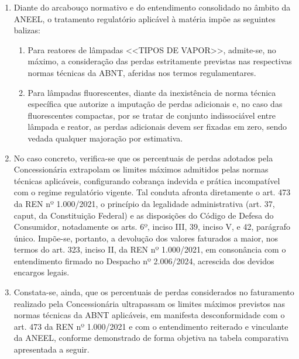 \begin{enumerate}[resume]
{(iii) determinar que esta decisão seja cumprida no prazo de 15 (quinze) dias após o seu trânsito em julgado; e  

(iv) determinar que a distribuidora envie à ANEEL, num prazo máximo de 15 (quinze) dias após o prazo previsto no item

(viii) desta decisão, comprovação do seu cumprimento. (grifou-se)}

\item
Diante do arcabouço normativo e do entendimento consolidado no âmbito da ANEEL, o tratamento regulatório aplicável à matéria impõe as seguintes balizas: 

\begin{enumerate}
    \ifperdaVapor
    \item %
    Para reatores de lâmpadas <<TIPOS DE VAPOR>>, admite-se, no máximo, a consideração das perdas estritamente previstas nas respectivas normas técnicas da ABNT, aferidas nos termos regulamentares.
    \fi
    \ifperdaFluorescente
    \item %
    Para lâmpadas fluorescentes, diante da inexistência de norma técnica específica que autorize a imputação de perdas adicionais  e, no caso das fluorescentes compactas, por se tratar de conjunto indissociável entre lâmpada e reator, as perdas adicionais devem ser fixadas em zero, sendo vedada qualquer majoração por estimativa.
    \fi
\end{enumerate}

\ifperdaVapor
\item %
No caso concreto, verifica-se que os percentuais de perdas adotados pela Concessionária extrapolam os limites máximos admitidos pelas normas técnicas aplicáveis, configurando cobrança indevida e prática incompatível com o regime regulatório vigente. Tal conduta afronta diretamente o art. 473 da REN nº 1.000/2021, o princípio da legalidade administrativa (art. 37, caput, da Constituição Federal) e as disposições do Código de Defesa do Consumidor, notadamente os arts. 6º, inciso III, 39, inciso V, e 42, parágrafo único. Impõe-se, portanto, a devolução dos valores faturados a maior, nos termos do art. 323, inciso II, da REN nº 1.000/2021, em consonância com o entendimento firmado no Despacho nº 2.006/2024, acrescida dos devidos encargos legais. 

\item %
Constata-se, ainda, que os percentuais de perdas considerados no faturamento realizado pela Concessionária ultrapassam os limites máximos previstos nas normas técnicas da ABNT aplicáveis, em manifesta desconformidade com o art. 473 da REN nº 1.000/2021 e com o entendimento reiterado e vinculante da ANEEL, conforme demonstrado de forma objetiva na tabela comparativa apresentada a seguir. 


\end{enumerate}

